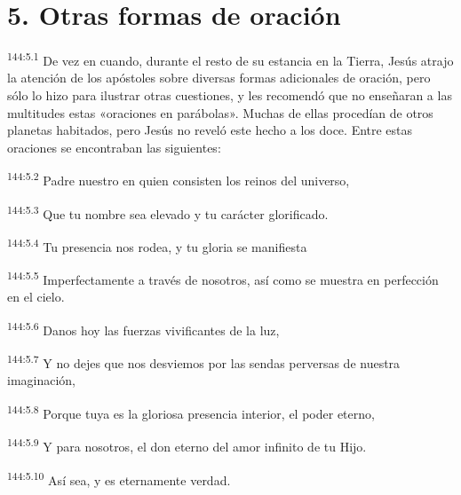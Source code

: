\section*{5. Otras formas de oración}
\par
\textsuperscript{144:5.1} De vez en cuando, durante el resto de su estancia en la Tierra, Jesús atrajo la atención de los apóstoles sobre diversas formas adicionales de oración, pero sólo lo hizo para ilustrar otras cuestiones, y les recomendó que no enseñaran a las multitudes estas «oraciones en parábolas». Muchas de ellas procedían de otros planetas habitados, pero Jesús no reveló este hecho a los doce. Entre estas oraciones se encontraban las siguientes:
\begin{center}
\par
\textsuperscript{144:5.2} Padre nuestro en quien consisten los reinos del universo,

\par
\textsuperscript{144:5.3} Que tu nombre sea elevado y tu carácter glorificado.

\par
\textsuperscript{144:5.4} Tu presencia nos rodea, y tu gloria se manifiesta

\par
\textsuperscript{144:5.5} Imperfectamente a través de nosotros, así como se muestra en perfección en el cielo.

\par
\textsuperscript{144:5.6} Danos hoy las fuerzas vivificantes de la luz,

\par
\textsuperscript{144:5.7} Y no dejes que nos desviemos por las sendas perversas de nuestra imaginación,

\par
\textsuperscript{144:5.8} Porque tuya es la gloriosa presencia interior, el poder eterno,

\par
\textsuperscript{144:5.9} Y para nosotros, el don eterno del amor infinito de tu Hijo.

\par
\textsuperscript{144:5.10} Así sea, y es eternamente verdad.
\end{center}

